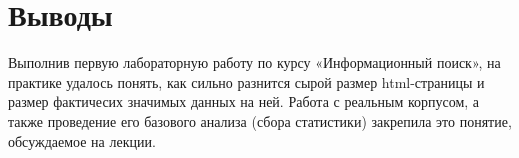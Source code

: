 \section{Выводы}
Выполнив первую лабораторную работу по курсу «Информационный поиск», на практике удалось понять, как сильно разнится сырой размер html-страницы и размер фактичесих значимых данных на ней. Работа с реальным корпусом, а также проведение его базового анализа (сбора статистики) закрепила это понятие, обсуждаемое на лекции.
\pagebreak
